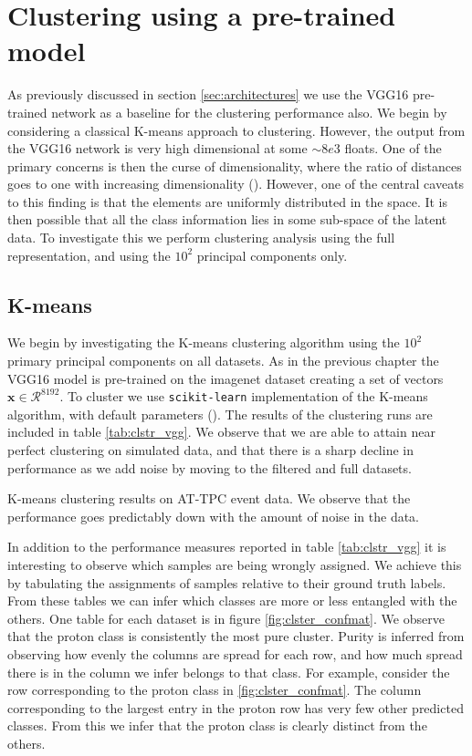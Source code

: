 \section{Clustering using a pre-trained model}\label{sec:vgg_cluster}

As previously discussed in section \ref{sec:architectures} we use the VGG16 pre-trained network as a baseline for the clustering performance also. We begin by considering a classical K-means approach to clustering. However, the output from the VGG16 network is very high dimensional at some $\sim 8e3$ floats. One of the primary concerns is then the curse of dimensionality, where the ratio of distances goes to one with increasing dimensionality (\cite{Aggarwal}). However, one of the central caveats to this finding is that the elements are uniformly distributed in the space. It is then possible that all the class information lies in some sub-space of the latent data. To investigate this we perform clustering analysis using the full representation, and using the $10^2$ principal components only. 

\subsection{K-means}

We begin by investigating the K-means clustering algorithm using the $10^2$ primary principal components on all datasets. As in the previous chapter the VGG16 model is pre-trained on the imagenet dataset creating a set of vectors $\mathbf{x} \in \mathcal{R}^{8192}$. To cluster we use \lstinline{scikit-learn} implementation of the K-means algorithm, with default parameters (\cite{Pedregosa2011}). The results of the clustering runs are included in table \ref{tab:clstr_vgg}. We observe  that we are able to attain near perfect clustering on simulated data, and that there is a sharp decline in performance as we add noise by moving to the filtered and full datasets. 

\begin{table}[H]
\centering 
\caption[K-means on pre-trained model]{K-means clustering results on AT-TPC event data. We observe that the performance goes predictably down with the amount of noise in the data.}\label{tab:clstr_vgg}

\end{table}

In addition to the performance measures reported in table \ref{tab:clstr_vgg} it is interesting to observe which samples are being wrongly assigned. We achieve this by tabulating the assignments of samples relative to their ground truth labels. From these tables we can infer which classes are more or less entangled with the others. One table for each dataset is in figure \ref{fig:clster_confmat}. We observe that the proton class is consistently the most pure cluster. Purity is inferred from observing how evenly the columns are spread for each row, and how much spread there is in the column we infer belongs to that class. For example, consider the row corresponding to the proton class in \ref{fig:clster_confmat}. The column corresponding to the largest entry in the proton row has very few other predicted classes. From this we infer that the proton class is clearly distinct from the others. 

